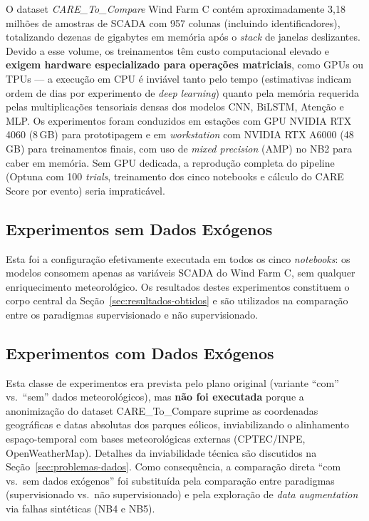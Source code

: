 \documentclass[12pt]{article}
\begin{document}
O dataset \emph{CARE\_To\_Compare} Wind Farm C contém aproximadamente 3,18 milhões de amostras de SCADA com 957 colunas (incluindo identificadores), totalizando dezenas de gigabytes em memória após o \emph{stack} de janelas deslizantes. Devido a esse volume, os treinamentos têm custo computacional elevado e \textbf{exigem hardware especializado para operações matriciais}, como GPUs ou TPUs --- a execução em CPU é inviável tanto pelo tempo (estimativas indicam ordem de dias por experimento de \emph{deep learning}) quanto pela memória requerida pelas multiplicações tensoriais densas dos modelos CNN, BiLSTM, Atenção e MLP. Os experimentos foram conduzidos em estações com GPU NVIDIA RTX 4060 (8\,GB) para prototipagem e em \emph{workstation} com NVIDIA RTX A6000 (48\,GB) para treinamentos finais, com uso de \emph{mixed precision} (AMP) no NB2 para caber em memória. Sem GPU dedicada, a reprodução completa do pipeline (Optuna com 100 \emph{trials}, treinamento dos cinco notebooks e cálculo do CARE Score por evento) seria impraticável.

\subsection{Experimentos sem Dados Exógenos}

Esta foi a configuração efetivamente executada em todos os cinco \textit{notebooks}: os modelos consomem apenas as variáveis SCADA do Wind Farm C, sem qualquer enriquecimento meteorológico. Os resultados destes experimentos constituem o corpo central da Seção~\ref{sec:resultados-obtidos} e são utilizados na comparação entre os paradigmas supervisionado e não supervisionado.

\subsection{Experimentos com Dados Exógenos}

\begin{sloppypar}
Esta classe de experimentos era prevista pelo plano original (variante ``com'' vs.\ ``sem'' dados meteorológicos), mas \textbf{não foi executada} porque a anonimização do dataset CARE\_To\_Compare suprime as coordenadas geográficas e datas absolutas dos parques eólicos, inviabilizando o alinhamento espaço-temporal com bases meteorológicas externas (CPTEC/INPE, OpenWeatherMap). Detalhes da inviabilidade técnica são discutidos na Seção~\ref{sec:problemas-dados}. Como consequência, a comparação direta ``com vs.\ sem dados exógenos'' foi substituída pela comparação entre paradigmas (supervisionado vs.\ não supervisionado) e pela exploração de \textit{data augmentation} via falhas sintéticas (NB4 e NB5).
\end{sloppypar}
\end{document}
